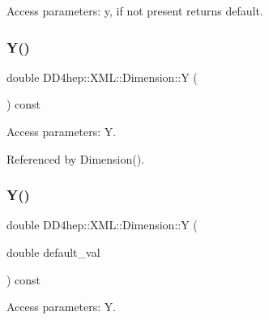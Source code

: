 Access parameters\+: y, if not present returns default. 

\hypertarget{struct_d_d4hep_1_1_x_m_l_1_1_dimension_acb0608c278e40e3a2d27f77e86cd7326}{}\label{struct_d_d4hep_1_1_x_m_l_1_1_dimension_acb0608c278e40e3a2d27f77e86cd7326} 
\subsubsection{\texorpdfstring{Y()}{Y()}\hspace{0.1cm}{\footnotesize\ttfamily [1/2]}}
{\footnotesize\ttfamily double D\+D4hep\+::\+X\+M\+L\+::\+Dimension\+::Y (\begin{DoxyParamCaption}{ }\end{DoxyParamCaption}) const}



Access parameters\+: Y. 



Referenced by Dimension().

\hypertarget{struct_d_d4hep_1_1_x_m_l_1_1_dimension_afaec9ec83a4df1d7edd0c2501ab6264f}{}\label{struct_d_d4hep_1_1_x_m_l_1_1_dimension_afaec9ec83a4df1d7edd0c2501ab6264f} 
\subsubsection{\texorpdfstring{Y()}{Y()}\hspace{0.1cm}{\footnotesize\ttfamily [2/2]}}
{\footnotesize\ttfamily double D\+D4hep\+::\+X\+M\+L\+::\+Dimension\+::Y (\begin{DoxyParamCaption}\item[{double}]{default\+\_\+val }\end{DoxyParamCaption}) const}



Access parameters\+: Y. 

\hypertarget{struct_d_d4hep_1_1_x_m_l_1_1_dimension_afe682ea84e24c347abd81bdf71c11085}{}\label{struct_d_d4hep_1_1_x_m_l_1_1_dimension_afe682ea84e24c347abd81bdf71c11085} 
